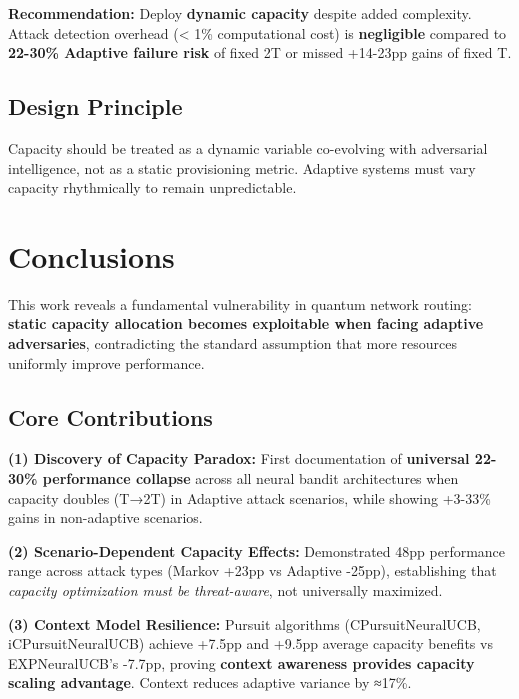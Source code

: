 \documentclass[11pt,a4paper]{article}
\newcommand{\critical}[1]{\textcolor{criticalcolor}{\textbf{#1}}}
\newcommand{\success}[1]{\textcolor{successcolor}{\textbf{#1}}}
\begin{document}
\vspace{-0.2cm}

\textbf{Recommendation:} Deploy \success{dynamic capacity} despite added complexity. Attack detection overhead (< 1\% computational cost) is \textbf{negligible} compared to \critical{22-30\% Adaptive failure risk} of fixed 2T or missed +14-23pp gains of fixed T.

\subsection{Design Principle}

\begin{tcolorbox}[colback=successcolor!10,colframe=successcolor,title=Design Principle]
Capacity should be treated as a dynamic variable co-evolving with adversarial intelligence, not as a static provisioning metric. Adaptive systems must vary capacity rhythmically to remain unpredictable.
\end{tcolorbox}

\section{Conclusions}

This work reveals a fundamental vulnerability in quantum network routing: \critical{static capacity allocation becomes exploitable when facing adaptive adversaries}, contradicting the standard assumption that more resources uniformly improve performance.

\subsection{Core Contributions}

\textbf{(1) Discovery of Capacity Paradox:} First documentation of \critical{universal 22-30\% performance collapse} across all neural bandit architectures when capacity doubles (T→2T) in Adaptive attack scenarios, while showing +3-33\% gains in non-adaptive scenarios.

\textbf{(2) Scenario-Dependent Capacity Effects:} Demonstrated 48pp performance range across attack types (Markov +23pp vs Adaptive -25pp), establishing that \textit{capacity optimization must be threat-aware}, not universally maximized.

\textbf{(3) Context Model Resilience:} Pursuit algorithms (CPursuitNeuralUCB, iCPursuitNeuralUCB) achieve +7.5pp and +9.5pp average capacity benefits vs EXPNeuralUCB's -7.7pp, proving \success{context awareness provides capacity scaling advantage}. Context reduces adaptive variance by ≈17\%.
\end{document}
